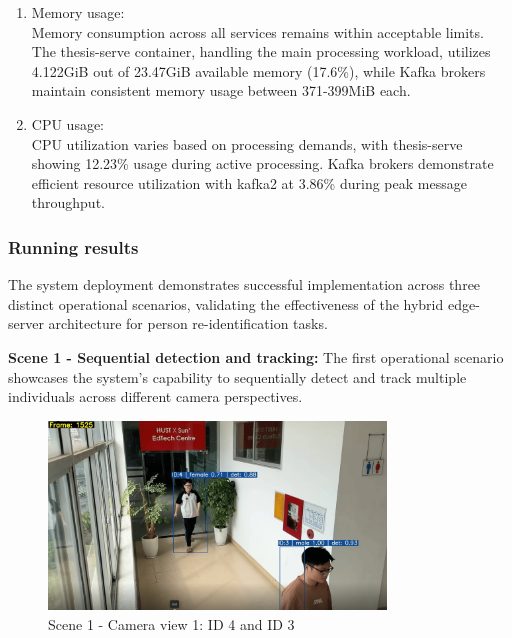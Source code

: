 \begin{enumerate}
    \item Memory usage:\\
    Memory consumption across all services remains within acceptable limits. The thesis-serve container, handling the main processing workload, utilizes 4.122GiB out of 23.47GiB available memory (17.6\%), while Kafka brokers maintain consistent memory usage between 371-399MiB each.
    
    \item CPU usage:\\
    CPU utilization varies based on processing demands, with thesis-serve showing 12.23\% usage during active processing. Kafka brokers demonstrate efficient resource utilization with kafka2 at 3.86\% during peak message throughput.

\end{enumerate}

\subsubsection{Running results}

The system deployment demonstrates successful implementation across three distinct operational scenarios, validating the effectiveness of the hybrid edge-server architecture for person re-identification tasks.

\textbf{Scene 1 - Sequential detection and tracking:}
The first operational scenario showcases the system's capability to sequentially detect and track multiple individuals across different camera perspectives.

\begin{figure}[htbp]
    \centering
    \includegraphics[width=0.8\textwidth]{Figure/huytuanvanhs1.png}
    \caption{Scene 1 - Camera view 1: ID 4 and ID 3}
    \label{fig:huytuanvanhs1}
\end{figure}


